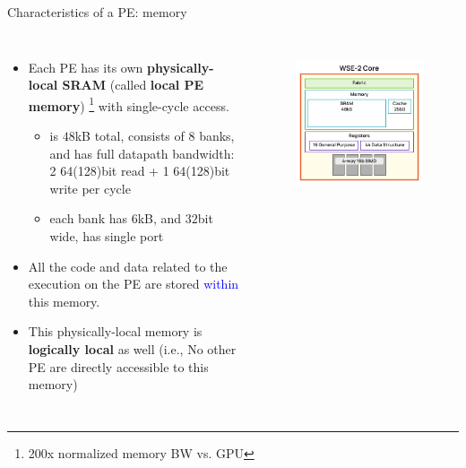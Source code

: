 \documentclass[dvipdfmx, 11pt, aspectratio=169]{beamer}   %
\begin{document}
\begin{frame}{Characteristics of a PE: memory}
\begin{columns}
\begin{itemize}
    \item Each PE has its own \textbf{physically-local SRAM} (called \textbf{local PE memory}) \footnote{200x normalized memory BW vs. GPU} with single-cycle access.
    \begin{itemize}
        \item is $48$kB total, consists of $8$ banks, and has full datapath bandwidth: 2 64(128)bit read + 1 64(128)bit write per cycle
        \item each bank has $6$kB, and $32$bit wide, has single port
    \end{itemize}
    \item All the code and data related to the execution on the PE are stored \textcolor{blue}{within} this memory.
    \item This physically-local memory is \textbf{logically local} as well (i.e., No other PE are directly accessible to this memory)
\end{itemize}
\vspace{-\baselineskip}
\begin{figure}
    \includegraphics[scale=0.22]{img/wse2Core.png}\\

\end{figure}
\end{columns}
\end{frame}
\end{document}
